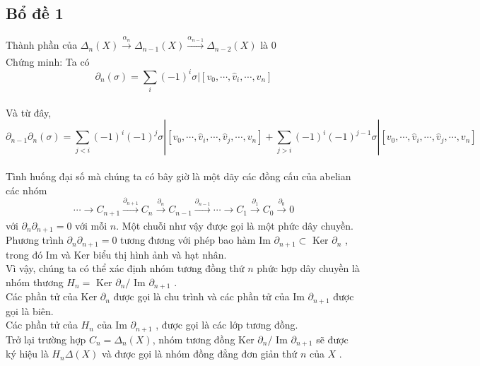 \subsection[Bổ đề 1]{Bổ đề 1}
\indent Thành phần của  \(\Delta_n(X)\xrightarrow[]{\alpha_n}\Delta_{n-1}(X)\xrightarrow[]{\alpha_{n-1}}\Delta_{n-2}(X)\) là \(0\) \\
\indent Chứng minh: Ta có \[\partial_n(\sigma) = \sum_{i}(-1)^i\sigma|[v_0, \cdots,\hat{v}_i,\cdots,v_n]\] \\
\indent Và từ đây, \[\partial_{n-1}\partial_n(\sigma) = \sum_{j<i}(-1)^i(-1)^j\sigma|[v_0, \cdots,\hat{v}_i,\cdots,\hat{v}_j,\cdots,v_n]  + \sum_{j>i}(-1)^i(-1)^{j-1}\sigma|[v_0, \cdots,\hat{v}_i,\cdots,\hat{v}_j,\cdots,v_n] \] \\
\indent Tình huống đại số mà chúng ta có bây giờ là một dãy các đồng cấu của abelian các nhóm 
\[\cdots\rightarrow C_{n+1} \xrightarrow[]{\partial_{n+1}} C_{n} \xrightarrow[]{\partial_{n}} C_{n-1} \xrightarrow[]{\partial_{n-1}} \cdots \rightarrow C_1 \xrightarrow[]{\partial_{1}} C_0 \xrightarrow[]{\partial_{0}} 0 \]
với \(\partial_n\partial_{n+1} = 0\) với mỗi \(n\). Một chuỗi như vậy được gọi là một phức dây chuyền. \\
\indent Phương trình \(\partial_n\partial_{n+1} = 0\) tương đương với phép bao hàm Im \(\partial_{n+1} \subset\) Ker \(\partial_n\) , trong đó Im và Ker biểu thị hình ảnh và hạt nhân. \\
\indent Vì vậy, chúng ta có thể xác định nhóm tương đồng thứ \(n\) phức hợp dây chuyền là nhóm thương \(H_n =\) Ker \(\partial_n / \) Im \(\partial_{n+1}\) . \\
\indent Các phần tử của Ker \(\partial_n\) được gọi là chu trình và các phần tử của Im \(\partial_{n+1}\) được gọi là biên.  \\
\indent Các phần tử của \(H_n\) của Im \(\partial_{n+1}\) , được gọi là các lớp tương đồng. \\
\indent Trở lại trường hợp \(C_n = \Delta_n(X)\), nhóm tương đồng Ker \(\partial_n/\) Im \(\partial_{n+1}\) sẽ được ký hiệu là \(H_n\Delta(X)\) và được gọi là nhóm đồng đẳng đơn giản thứ \(n\) của \(X\) . 
\newpage

